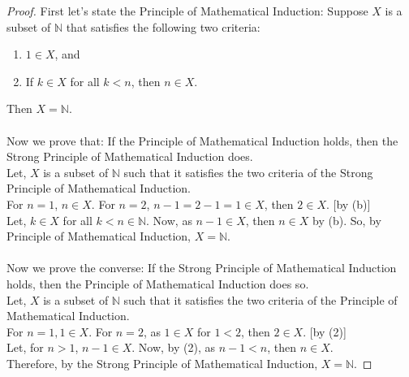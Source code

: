 \documentclass[12pt]{article}
\begin{document}
\begin{proof}
First let's state the Principle of Mathematical Induction: Suppose \( X \) is a subset of \( \mathbb{N} \) that satisfies the following two criteria:
\begin{enumerate}
    \item \( 1 \in X \), and
    \item If \( k \in X \) for all \( k < n \), then \( n \in X \).
\end{enumerate}
Then \( X = \mathbb{N} \).\\\\ 
Now we prove that: If the Principle of Mathematical Induction holds, then the Strong Principle of Mathematical Induction does. \\
Let, $X$ is a subset of $\mathbb{N}$ such that it satisfies the two criteria of the Strong Principle of Mathematical Induction. \\
For $n = 1$, $n \in X$. For $n = 2$, $n-1 = 2-1 = 1 \in X$, then $2 \in X$. {[by (b)]}\\
Let, $k \in X$ for all $k < n \in \mathbb{N}$. Now, as $n-1 \in X$, then $n \in X$ by (b). So, by Principle of Mathematical Induction, $X = \mathbb{N}$.\\\\
Now we prove the converse: If the Strong Principle of Mathematical Induction holds, then the Principle of Mathematical Induction does so. \\
Let, $X$ is a subset of $\mathbb{N}$ such that it satisfies the two criteria of the Principle of Mathematical Induction. \\
For $n = 1, 1 \in X$. For $n = 2$, as $1 \in X$ for $1 < 2$, then $2 \in X$. {[by (2)]} \\
Let, for $n > 1$, $n - 1 \in X$. Now, by (2), as $n-1 < n$, then $n \in X$. \\
Therefore, by the Strong Principle of Mathematical Induction, $X = \mathbb{N}$.


\end{proof}














 
\end{document}
